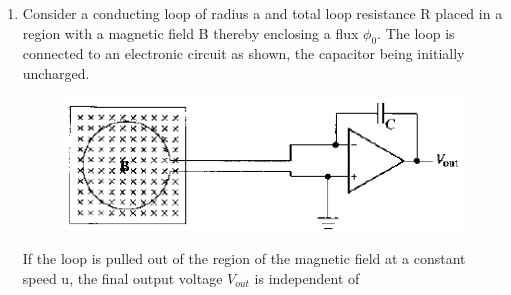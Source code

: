 \documentclass[journal,12pt,onecolumn]{IEEEtran}
\theoremstyle{remark}
\begin{document}
\begin{enumerate}
\begin{enumerate}  \end{enumerate}

\item Consider a conducting loop of radius a and total loop resistance R placed in a region with a magnetic field B thereby enclosing a flux $\phi_0$. The loop is connected to an electronic circuit as shown, the capacitor being initially uncharged.
	\begin{figure}[H]
	\centering
		\caption*{} \label{fig:39} \caption*{} \label{fig:} \includegraphics[width=0.8\columnwidth]{figs/39.png}
	\end{figure}
	If the loop is pulled out of the region of the magnetic field at a constant speed u, the final output voltage $V_{out}$ is independent of\hfill{}


\begin{enumerate}  \end{enumerate}


\end{enumerate}
\end{document}
